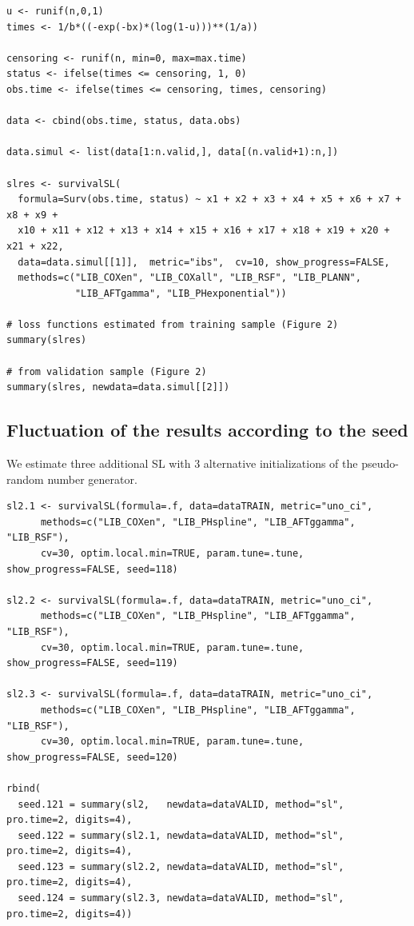 \begin{verbatim}
u <- runif(n,0,1)
times <- 1/b*((-exp(-bx)*(log(1-u)))**(1/a))

censoring <- runif(n, min=0, max=max.time)
status <- ifelse(times <= censoring, 1, 0)
obs.time <- ifelse(times <= censoring, times, censoring)
  
data <- cbind(obs.time, status, data.obs)

data.simul <- list(data[1:n.valid,], data[(n.valid+1):n,])

slres <- survivalSL(
  formula=Surv(obs.time, status) ~ x1 + x2 + x3 + x4 + x5 + x6 + x7 + x8 + x9 + 
  x10 + x11 + x12 + x13 + x14 + x15 + x16 + x17 + x18 + x19 + x20 + x21 + x22,
  data=data.simul[[1]],  metric="ibs",  cv=10, show_progress=FALSE,
  methods=c("LIB_COXen", "LIB_COXall", "LIB_RSF", "LIB_PLANN",
            "LIB_AFTgamma", "LIB_PHexponential"))

# loss functions estimated from training sample (Figure 2)
summary(slres) 

# from validation sample (Figure 2)
summary(slres, newdata=data.simul[[2]]) 
\end{verbatim}

\hypertarget{fluctuation-of-the-results-according-to-the-seed}{%
\subsection{Fluctuation of the results according to the seed}\label{fluctuation-of-the-results-according-to-the-seed}}

We estimate three additional SL with 3 alternative initializations of the pseudo-random number generator.

\begin{verbatim}
sl2.1 <- survivalSL(formula=.f, data=dataTRAIN, metric="uno_ci",
      methods=c("LIB_COXen", "LIB_PHspline", "LIB_AFTggamma", "LIB_RSF"),
      cv=30, optim.local.min=TRUE, param.tune=.tune, show_progress=FALSE, seed=118)

sl2.2 <- survivalSL(formula=.f, data=dataTRAIN, metric="uno_ci",
      methods=c("LIB_COXen", "LIB_PHspline", "LIB_AFTggamma", "LIB_RSF"),
      cv=30, optim.local.min=TRUE, param.tune=.tune, show_progress=FALSE, seed=119)

sl2.3 <- survivalSL(formula=.f, data=dataTRAIN, metric="uno_ci",
      methods=c("LIB_COXen", "LIB_PHspline", "LIB_AFTggamma", "LIB_RSF"),
      cv=30, optim.local.min=TRUE, param.tune=.tune, show_progress=FALSE, seed=120)

rbind(
  seed.121 = summary(sl2,   newdata=dataVALID, method="sl", pro.time=2, digits=4),
  seed.122 = summary(sl2.1, newdata=dataVALID, method="sl", pro.time=2, digits=4),
  seed.123 = summary(sl2.2, newdata=dataVALID, method="sl", pro.time=2, digits=4),
  seed.124 = summary(sl2.3, newdata=dataVALID, method="sl", pro.time=2, digits=4))
\end{verbatim}

